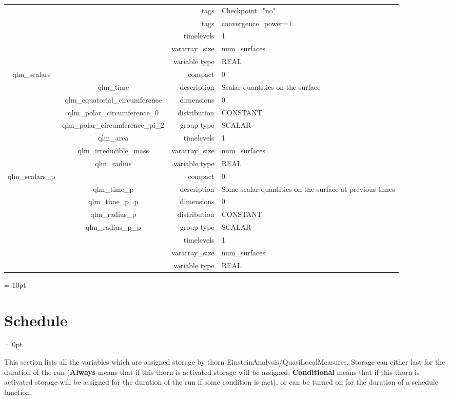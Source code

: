 \begin{tabular*}{150mm}{|c|c@{\extracolsep{\fill}}|rl|}
 &  & tags & Checkpoint="no" \\ 
& ~ & tags & convergence\_power=1 \\ 
 &  & timelevels & 1 \\ 
 &  & vararray\_size & num\_surfaces \\ 
 &  & variable type & REAL \\ 
\hline 
qlm\_scalars &  & compact & 0 \\ 
 & qlm\_time & description & Scalar quantities on the surface \\ 
 & qlm\_equatorial\_circumference & dimensions & 0 \\ 
 & qlm\_polar\_circumference\_0 & distribution & CONSTANT \\ 
 & qlm\_polar\_circumference\_pi\_2 & group type & SCALAR \\ 
 & qlm\_area & timelevels & 1 \\ 
 & qlm\_irreducible\_mass & vararray\_size & num\_surfaces \\ 
 & qlm\_radius & variable type & REAL \\ 
\hline 
qlm\_scalars\_p &  & compact & 0 \\ 
 & qlm\_time\_p & description & Some scalar quantities on the surface at previous times \\ 
 & qlm\_time\_p\_p & dimensions & 0 \\ 
 & qlm\_radius\_p & distribution & CONSTANT \\ 
 & qlm\_radius\_p\_p & group type & SCALAR \\ 
 &  & timelevels & 1 \\ 
 &  & vararray\_size & num\_surfaces \\ 
 &  & variable type & REAL \\ 
\hline 
\end{tabular*} 



\vspace{5mm}\parskip = 10pt 

\section{Schedule} 


\parskip = 0pt


\noindent This section lists all the variables which are assigned storage by thorn EinsteinAnalysis/QuasiLocalMeasures.  Storage can either last for the duration of the run ({\bf Always} means that if this thorn is activated storage will be assigned, {\bf Conditional} means that if this thorn is activated storage will be assigned for the duration of the run if some condition is met), or can be turned on for the duration of a schedule function.


